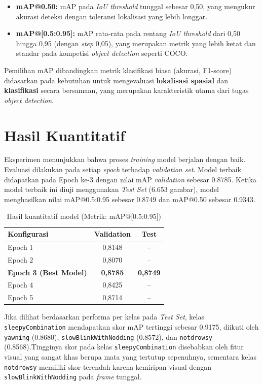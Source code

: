 \documentclass[11pt,a4paper,oneside]{report}
\begin{document}
\begin{itemize}[leftmargin=*]
    \item \textbf{mAP@0.50:} mAP pada \textit{IoU threshold} tunggal sebesar 0,50, yang mengukur akurasi deteksi dengan toleransi lokalisasi yang lebih longgar.
    \item \textbf{mAP@[0.5:0.95]:} mAP rata-rata pada rentang \textit{IoU threshold} dari 0,50 hingga 0,95 (dengan \textit{step} 0,05), yang merupakan metrik yang lebih ketat dan standar pada kompetisi \textit{object detection} seperti COCO.
\end{itemize}

Pemilihan mAP dibandingkan metrik klasifikasi biasa (akurasi, F1-score) didasarkan pada kebutuhan untuk mengevaluasi \textbf{lokalisasi spasial} dan \textbf{klasifikasi} secara bersamaan, yang merupakan karakteristik utama dari tugas \textit{object detection}.

\section{Hasil Kuantitatif}

Eksperimen menunjukkan bahwa proses \textit{training} model berjalan dengan baik. Evaluasi dilakukan pada setiap \textit{epoch} terhadap \textit{validation set}. Model terbaik didapatkan pada Epoch ke-3 dengan nilai mAP \textit{validation} sebesar 0.8785. Ketika model terbaik ini diuji menggunakan \textit{Test Set} (6.653 gambar), model menghasilkan nilai mAP@0.5:0.95 sebesar 0.8749 dan mAP@0.50 sebesar 0.9343.

\begin{table}[h!]
\centering
\caption{Hasil kuantitatif model (Metrik: mAP@[0.5:0.95])}
\label{tab:hasil}
\begin{tabular}{lcc}
\toprule
\textbf{Konfigurasi} & \textbf{Validation} & \textbf{Test} \\
\midrule
Epoch 1     & 0,8148 & -- \\
Epoch 2     & 0,8070 & -- \\
\textbf{Epoch 3 (Best Model)} & \textbf{0,8785} & \textbf{0,8749} \\
Epoch 4     & 0,8425 & -- \\
Epoch 5     & 0,8714 & -- \\
\bottomrule
\end{tabular}
\end{table}

Jika dilihat berdasarkan performa per kelas pada \textit{Test Set}, kelas \texttt{sleepyCombination} mendapatkan skor mAP tertinggi sebesar 0.9175, diikuti oleh \texttt{yawning} (0.8680), \texttt{slowBlinkWithNodding} (0.8572), dan \texttt{notdrowsy} (0.8568).Tingginya skor pada kelas \texttt{sleepyCombination} disebabkan oleh fitur visual yang sangat khas berupa mata yang tertutup sepenuhnya, sementara kelas \texttt{notdrowsy} memiliki skor terendah karena kemiripan visual dengan \texttt{slowBlinkWithNodding} pada \textit{frame} tunggal.
\end{document}
